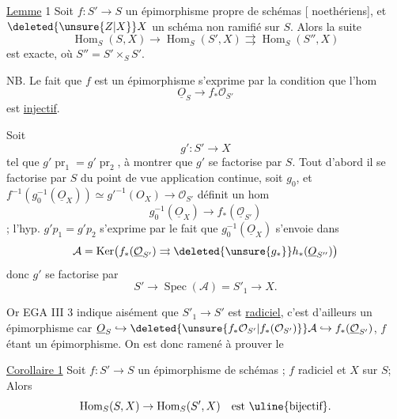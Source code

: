 \uline{Lemme} 1 Soit $f:S'\to S$ un épimorphisme propre de schémas [ noethériens], et $\deleted{\unsure{Z|X}}X$ un schéma  non ramifié sur $S$.
Alors la suite
\[
\operatorname{Hom}_S(S,X)\to\operatorname{Hom}_S(S',X)\rightrightarrows\operatorname{Hom}_{S}(S'',X)
\]
est exacte, où $S''=S'\times_S S'$.

NB. Le fait que $f$ est un épimorphisme s'exprime par la condition que l'hom
\[
\underline O_S\to f_\ast\mathcal O_{S'}
\]
est \uline{injectif}.

Soit
\[
g':S'\to X
\]
tel que $g'\operatorname{pr}_1=g'\operatorname{pr}_2$, à montrer que $g'$ se factorise par $S$. Tout d'abord il se factorise par $S$ du point de vue application continue, soit $g_0$, et $f^{-1}(g_0^{-1}(\underline O_X))\simeq {g'}^{-1}(O_X)\to\mathcal O_{S'}$ définit un hom
\[
g_0^{-1}(\underline O_X)\to f_\ast(\underline{\mathcal O}_{S'})
\]
;
l'hyp. $g'p_1=g'p_2$ s'exprime par le fait que $g_0^{-1}(\underline O_X)$ s'envoie dans
\[
\mathcal A=\operatorname{Ker}\bigl(f_\ast(\underline{\mathcal O}_{S'})\rightrightarrows\deleted{\unsure{g_\ast}}h_\ast(\underline O_{S''})\bigr)
\]
donc $g'$ se factorise par
\[
S'\to\operatorname{Spec}(\mathcal A)=S'_1\to X.
\]

Or EGA III 3 indique aisément que $S'_1\to S'$ est  \uline{radiciel}, c'est d'ailleurs un épimorphisme car $\underline O_S\hookrightarrow\deleted{\unsure{f_\ast\mathcal O_{S'}|f_\ast(\mathcal O_{S'})}}\mathcal A\hookrightarrow f_\ast(\underline{\mathcal O}_{S'})$, $f$ étant un épimorphisme. On est donc ramené à prouver le

\uline{Corollaire 1} Soit $f:S'\to S$ un épimorphisme de schémas ; $f$   radiciel et $X$   sur $S$;   Alors
\[
\operatorname{Hom}_S(S,X)\to\operatorname{Hom}_S(S',X)\quad\text{est \uline{bijectif}.}
\]

